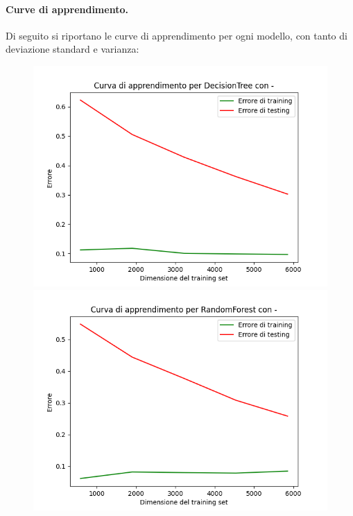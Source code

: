 \paragraph{Curve di apprendimento.} Di seguito si riportano le curve di apprendimento per ogni modello, con tanto di deviazione standard e varianza:

\begin{figure}[H]
    \centering
    \begin{minipage}[b]{0.45\linewidth}
      \centering
      \includegraphics[scale=0.5]{img/learning_curve_DecisionTree_-.png}
      
    \end{minipage}
    \hfill
    \begin{minipage}[b]{0.45\linewidth}
      \centering
      \includegraphics[scale=0.5]{img/learning_curve_RandomForest_-.png}
      

\end{minipage}
\end{figure}
